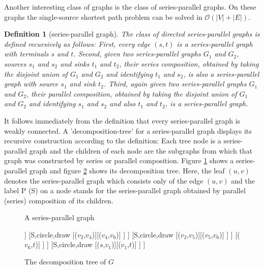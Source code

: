 \documentclass[]{article}
\newtheorem{definition}[theorem]{Definition}
\numberwithin{equation}{section}
\begin{document}
Another interesting class of graphs is the class of series-parallel graphs. On these graphs the single-source shortest path problem can be solved in $\mathcal{O}(|V|+|E|)$.

\begin{definition}[series-parallel graph]
	\label{def:spg}
	The class of directed series-parallel graphs is defined recursively as follows: First, every edge $(s, t)$ is a series-parallel graph with terminals $s$ and $t$. Second, given two series-parallel graphs $G_1$ and $G_2$, sources $s_1$ and $s_2$ and sinks $t_1$ and $t_2$, their series composition, obtained by taking the disjoint union of $G_1$ and $G_2$ and identifying $t_1$ and $s_2$, is also a series-parallel graph with source $s_1$ and sink $t_2$. Third, again given two series-parallel graphs $G_1$ and $G_2$, their parallel composition, obtained by taking the disjoint union of $G_1$ and $G_2$ and identifying $s_1$ and $s_2$ and also $t_1$ and $t_2$, is a series-parallel graph.
\end{definition}

It follows immediately from the definition that every series-parallel graph is weakly connected. A 'decomposition-tree' for a series-parallel graph displays its recursive construction according to the definition: Each tree node is a series-parallel graph and the children of each node are the subgraphs from which that graph was constructed by series or parallel composition. Figure \ref{fig:spgraph} shows a series-parallel graph and figure \ref{fig:spdecomp} shows its decomposition tree. Here, the leaf $(u, v)$ denotes the series-parallel graph which consists only of the edge $(u, v)$ and the label P (S) on a node stands for the series-parallel graph obtained by parallel (series) composition of its children.

\begin{figure}[H]
	\centering
	\caption{A series-parallel graph}
	\label{fig:spgraph}
\end{figure}
\begin{figure}[h]
	\centering
	\begin{forest}
	[P,circle,draw
		[S,circle,draw
			[({$s$,}$v_2$)]
			[S,circle,draw
				[P,circle,draw
					[P,circle,draw
						[S,circle,draw
							[({$v_2$,}$v_3$)][({$v_3$,}$v_6$)]
						]
						[S,circle,draw
							[({$v_2$,}$v_4$)][({$v_4$,}$v_6$)]
						]
					]
					[S,circle,draw
						[({$v_2$,}$v_5$)][({$v_5$,}$v_6$)]
					]
				]
				[({$v_6$,}$t$)]
			]
		]
		[S,circle,draw
			[({$s$,}$v_1$)][({$v_1$,}$t$)]
		]
	]
	\end{forest}
	\caption{The decomposition tree of $G$}
	\label{fig:spdecomp}
\end{figure}
\end{document}
